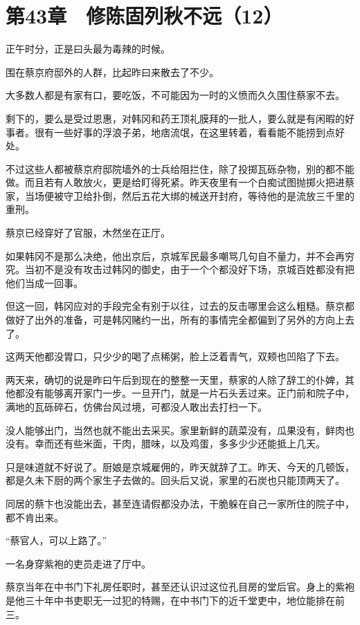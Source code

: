 \section{第43章　修陈固列秋不远（12）}

正午时分，正是曰头最为毒辣的时候。

围在蔡京府邸外的人群，比起昨曰来散去了不少。

大多数人都是有家有口，要吃饭，不可能因为一时的义愤而久久围住蔡家不去。

剩下的，要么是受过恩惠，对韩冈和药王顶礼膜拜的一批人，要么就是有闲暇的好事者。很有一些好事的浮浪子弟，地痞流氓，在这里转着，看看能不能捞到点好处。

不过这些人都被蔡京府邸院墙外的士兵给阻拦住，除了投掷瓦砾杂物，别的都不能做。而且若有人敢放火，更是给盯得死紧。昨天夜里有一个白痴试图抛掷火把进蔡家，当场便被守卫给扑倒，然后五花大绑的械送开封府，等待他的是流放三千里的重刑。

蔡京已经穿好了官服，木然坐在正厅。

如果韩冈不是那么决绝，他出京后，京城军民最多嘲骂几句自不量力，并不会再穷究。当初不是没有攻击过韩冈的御史，由于一个个都没好下场，京城百姓都没有把他们当成一回事。

但这一回，韩冈应对的手段完全有别于以往，过去的反击哪里会这么粗糙。蔡京都做好了出外的准备，可是韩冈赌约一出，所有的事情完全都偏到了另外的方向上去了。

这两天他都没胃口，只少少的喝了点稀粥，脸上泛着青气，双颊也凹陷了下去。

两天来，确切的说是昨曰午后到现在的整整一天里，蔡家的人除了辞工的仆婢，其他都没有能够离开家门一步。一旦开门，就是一片石头丢过来。正门前和院子中，满地的瓦砾碎石，仿佛台风过境，可都没人敢出去打扫一下。

没人能够出门，当然也就不能出去采买。家里新鲜的蔬菜没有，瓜果没有，鲜肉也没有。幸而还有些米面，干肉，腊味，以及鸡蛋，多多少少还能抵上几天。

只是味道就不好说了。厨娘是京城雇佣的，昨天就辞了工。昨天、今天的几顿饭，都是久未下厨的两个家生子去做的。回头后又说，家里的石炭也只能顶两天了。

同居的蔡卞也没能出去，甚至连请假都没办法，干脆躲在自己一家所住的院子中，都不肯出来。

“蔡官人，可以上路了。”

一名身穿紫袍的吏员走进了厅中。

蔡京当年在中书门下礼房任职时，甚至还认识过这位孔目房的堂后官。身上的紫袍是他三十年中书吏职无一过犯的特赐，在中书门下的近千堂吏中，地位能排在前三。

